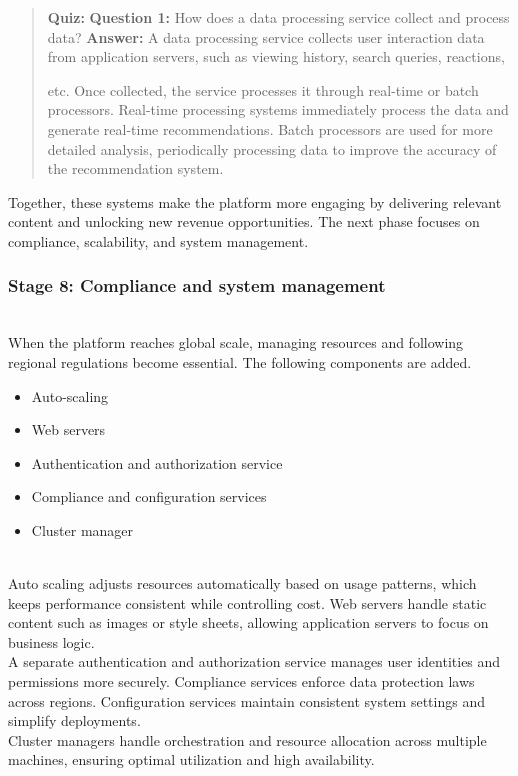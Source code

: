 \begin{quote}
\textbf{Quiz:}
\textbf{Question 1:} How does a data processing service collect and process data?
\textbf{Answer:} A data processing service collects user interaction data from application servers, such as viewing history, search queries, reactions,

etc. Once collected, the service processes it through real-time or batch processors. Real-time processing systems immediately process the data and generate real-time recommendations. Batch processors are used for more detailed analysis, periodically processing data to improve the accuracy of the recommendation system.
\end{quote}

Together, these systems make the platform more engaging by delivering relevant content and unlocking new revenue opportunities. The next phase focuses on compliance, scalability, and system management.

\subsubsection{Stage 8: Compliance and system management}\label{NA2K_n3JZ400WUSIqiFv2}
\\
When the platform reaches global scale, managing resources and following regional regulations become essential. The following components are added.

\begin{itemize}
\item
\protect{}\label{Nyq8wTr3UXjRbl--lLHSa}
Auto-scaling
\item
\protect{}\label{3fhXnZnYInTXBSkuv7FUm}
Web servers
\item
\protect{}\label{phBWwMxkBCor_ZIOJ7_A3}
Authentication and authorization service
\item
\protect{}\label{2IYdIgUGvvG1tnBpE__rH}
Compliance and configuration services
\item
\protect{}\label{1ikeeLBfjywhlPiPclDUP}
Cluster manager
\end{itemize}
\\
Auto scaling adjusts resources automatically based on usage patterns, which keeps performance consistent while controlling cost. Web servers handle static content such as images or style sheets, allowing application servers to focus on business logic.
\\
A separate authentication and authorization service manages user identities and permissions more securely. Compliance services enforce data protection laws across regions. Configuration services maintain consistent system settings and simplify deployments.
\\
Cluster managers handle orchestration and resource allocation across multiple machines, ensuring optimal utilization and high availability.

